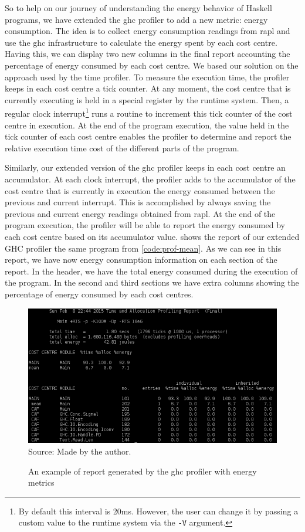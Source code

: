 So to help on our journey of understanding the energy behavior of Haskell programs, we have extended the \ac{ghc} profiler to add a new metric: energy consumption. The idea is to collect energy consumption readings from \ac{rapl} and use the \ac{ghc} infrastructure to calculate the energy spent by each cost centre. Having this, we can display two new columns in the final report accounting the percentage of energy consumed by each cost centre. We based our solution on the approach used by the time profiler. To measure the execution time, the profiler keeps in each cost centre a tick counter. At any moment, the cost centre that is currently executing is held in a special register by the runtime system. Then, a regular clock interrupt\footnote{By default this interval is 20ms. However, the user can change it by passing a custom value to the runtime system via the \texttt{-V} argument.} runs a routine to increment this tick counter of the cost centre in execution. At the end of the program execution, the value held in the tick counter of each cost centre enables the profiler to determine and report the relative execution time cost of the different parts of the program.

Similarly, our extended version of the \ac{ghc} profiler keeps in each cost centre an accumulator. At each clock interrupt, the profiler adds to the accumulator of the cost centre that is currently in execution the energy consumed between the previous and current interrupt. This is accomplished by always saving the previous and current energy readings obtained from \ac{rapl}. At the end of the program execution, the profiler will be able to report the energy consumed by each cost centre based on its accumulator value.  shows the report of our extended GHC profiler the same program from \autoref{code:prof-mean}. As we can see in this report, we have now energy consumption information on each section of the report. In the header, we have the total energy consumed during the execution of the program. In the second and third sections we have extra columns showing the percentage of energy consumed by each cost centres.

\begin{figure}[htp]
  \centering
  \caption{An example of report generated by the \ac{ghc} profiler with energy metrics}
  \includegraphics[width=\columnwidth]{images/energy-profiler-placeholder}
  \footnotesize{Source: Made by the author.}
  \label{fig:energy-prof-report}
\end{figure}

